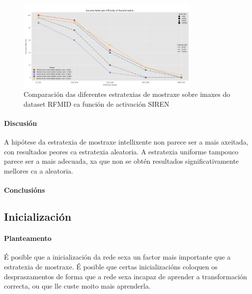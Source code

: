 \begin{figure}[ht]
    \centering
    \includegraphics[width=0.8\textwidth]{imaxes/muestraje/experiment_plot_RFMID_SIREN_RvsU.png}
    \caption{Comparación das diferentes estratexias de mostraxe sobre imaxes do dataset RFMID ca función de activación SIREN}
    \label{fig:sampling_comparison_SIREN}
\end{figure}



\paragraph{Discusión}
\label{par:Discusión}

A hipótese da estratexia de mostraxe intellixente non parece ser a mais axeitada, con resultados peores ca estratexia aleatoria. 
A estratexia uniforme tampouco parece ser a mais adecuada, xa que non se obtén resultados significativamente mellores ca a aleatoria.


\paragraph{Conclusións}
\label{par:Conclusións}

\subsection{Inicialización}
\label{subsec:Inicialización}



\paragraph{Planteamento}
\label{par:Planteamento}

É posible que a inicialización da rede sexa un factor mais importante que a estratexia de mostraxe. É posible que certas inicializacións coloquen os despraszamentos de forma que a rede sexa incapaz de aprender a transformación correcta, ou que lle custe moito mais aprenderla.

